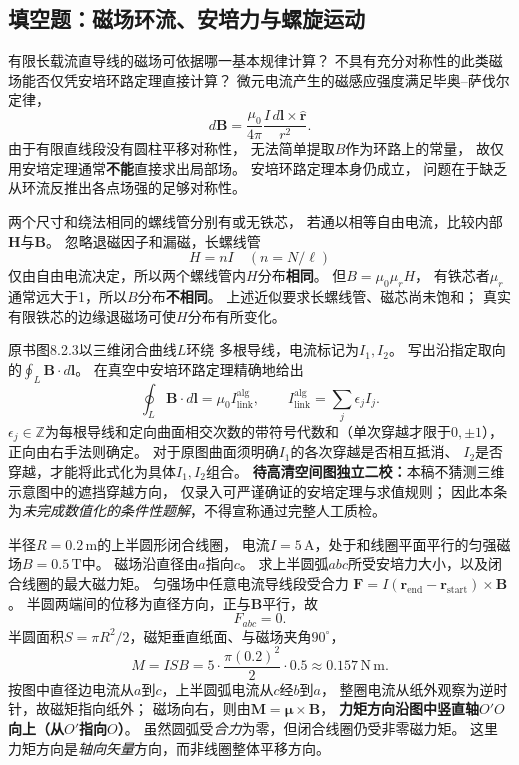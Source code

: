 \subsection{填空题：磁场环流、安培力与螺旋运动}

\problemtext 有限长载流直导线的磁场可依据哪一基本规律计算？
不具有充分对称性的此类磁场能否仅凭安培环路定理直接计算？
\workings
微元电流产生的磁感应强度满足毕奥--萨伐尔定律，
\[
\boxed{d\bm B=\frac{\mu_0}{4\pi}
\frac{I\,d\bm l\times\hat{\bm r}}{r^2}}.
\]
由于有限直线段没有圆柱平移对称性，
无法简单提取$B$作为环路上的常量，
故仅用安培定理通常\textbf{不能}直接求出局部场。
\crosscheck 安培环路定理本身仍成立，
问题在于缺乏从环流反推出各点场强的足够对称性。

\problemtext 两个尺寸和绕法相同的螺线管分别有或无铁芯，
若通以相等自由电流，比较内部$\bm H$与$\bm B$。
\workings
忽略退磁因子和漏磁，长螺线管
\[
\boxed{H=nI}\quad(n=N/\ell)
\]
仅由自由电流决定，所以两个螺线管内$H$分布\textbf{相同}。
但$B=\mu_0\mu_rH$，
有铁芯者$\mu_r$通常远大于1，所以$B$分布\textbf{不相同}。
\crosscheck 上述近似要求长螺线管、磁芯尚未饱和；
真实有限铁芯的边缘退磁场可使$H$分布有所变化。

\problemtext 原书图8.2.3以三维闭合曲线$L$环绕
多根导线，电流标记为$I_1,I_2$。
写出沿指定取向的$\oint_L\bm B\cdot d\bm l$。
\workings
在真空中安培环路定理精确地给出
\[
\boxed{\oint_L\bm B\cdot d\bm l
=\mu_0I_{\mathrm{link}}^{\mathrm{alg}}},\qquad
I_{\mathrm{link}}^{\mathrm{alg}}=\sum_j\epsilon_j I_j.
\]
$\epsilon_j\in\mathbb Z$为每根导线和定向曲面相交次数的带符号代数和（单次穿越才限于$0,\pm1$），正向由右手法则确定。
对于原图曲面须明确$I_1$的各次穿越是否相互抵消、
$I_2$是否穿越，才能将此式化为具体$I_1,I_2$组合。
\crosscheck \textbf{待高清空间图独立二校：}本稿不猜测三维示意图中的遮挡穿越方向，
仅录入可严谨确证的安培定理与求值规则；
因此本条为\emph{未完成数值化的条件性题解}，不得宣称通过完整人工质检。

\problemtext 半径$R=0.2\,\mathrm m$的上半圆形闭合线圈，
电流$I=5\,\mathrm A$，处于和线圈平面平行的匀强磁场$B=0.5\,\mathrm T$中。
磁场沿直径由$a$指向$c$。
求上半圆弧$abc$所受安培力大小，以及闭合线圈的最大磁力矩。
\workings
匀强场中任意电流导线段受合力
$\bm F=I(\bm r_{\mathrm{end}}-\bm r_{\mathrm{start}})\times\bm B$。
半圆两端间的位移为直径方向，正与$\bm B$平行，故
\[
\boxed{F_{abc}=0}.
\]
半圆面积$S=\pi R^2/2$，磁矩垂直纸面、与磁场夹角$90^\circ$，
\[
\boxed{M=ISB
=5\cdot\frac{\pi(0.2)^2}{2}\cdot0.5
\approx0.157\,\mathrm{N\,m}}.
\]
按图中直径边电流从$a$到$c$，上半圆弧电流从$c$经$b$到$a$，
整圈电流从纸外观察为逆时针，故磁矩指向纸外；
磁场向右，则由$\bm M=\bm\mu\times\bm B$，
\textbf{力矩方向沿图中竖直轴$O'O$向上（从$O'$指向$O$）}。
\crosscheck 虽然圆弧受\emph{合力}为零，但闭合线圈仍受非零磁力矩。
这里力矩方向是\emph{轴向矢量}方向，而非线圈整体平移方向。

